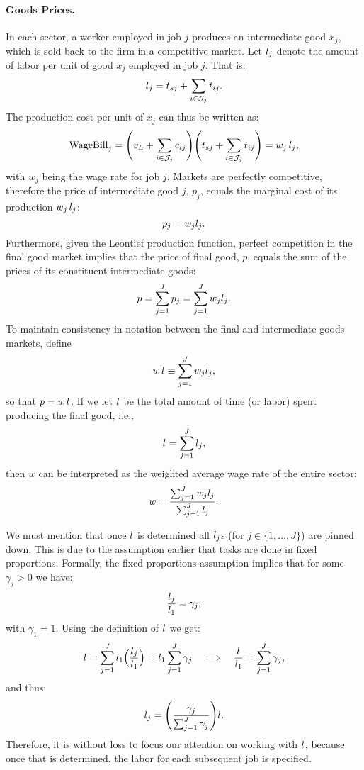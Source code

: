 \documentclass{article}
\theoremstyle{plain}
\theoremstyle{plain}
\begin{document}
\paragraph{Goods Prices.}  
In each sector, a worker employed in job $j$ produces an intermediate good $x_j$, which is sold back to the firm in a competitive market.  
Let $l_{j}$ denote the amount of labor per unit of good $x_j$ employed in job $j$.
That is:  
\[
l_{j} = t_{sj} + \sum_{i \in \mathcal{J}_j} t_{ij}.
\]  
The production cost per unit of $x_j$ can thus be written as:  
\[
\text{WageBill}_j = \Biggl(v_L + \sum_{i \in \mathcal{J}_j} c_{ij} \Biggr) \Biggl(t_{sj} + \sum_{i \in \mathcal{J}_j} t_{ij} \Biggr) = w_j \,l_{j},
\]  
with $w_j$ being the wage rate for job $j$.
Markets are perfectly competitive, therefore the price of intermediate good $j$, $p_j$, equals the marginal cost of its production $w_j\,l_{j}$:
\[
p_j = w_j l_{j}.
\]  
Furthermore, given the Leontief production function, perfect competition in the final good market implies that the price of final good, $p$, equals the sum of the prices of its constituent intermediate goods:
\[
p = \sum_{j=1}^J p_j = \sum_{j=1}^J w_j l_{j}.
\]  
To maintain consistency in notation between the final and intermediate goods markets, define  
\[
w \, l_{} \equiv \sum_{j=1}^J w_j l_{j},
\]
so that $p = w \, l_{}$.  
If we let $l_{}$ be the total amount of time (or labor) spent producing the final good, i.e.,
\[
l_{} = \sum_{j=1}^J l_{j},
\]
then $w$ can be interpreted as the weighted average wage rate of the entire sector:
\[
w = \frac{\sum_{j=1}^J w_j l_{j}}{\sum_{j=1}^J l_{j}}.
\]

We must mention that once $l_{}$ is determined all $l_{j}$s (for $j \in \{1,\ldots,J\}$) are pinned down.
This is due to the assumption earlier that tasks are done in fixed proportions.
Formally, the fixed proportions assumption implies that for some $\gamma_j > 0$ we have:  
\[
\frac{l_{j}}{l_{1}} = \gamma_j,
\]  
with $\gamma_1 = 1$.  
Using the definition of $l_{}$ we get: 
\[
l_{} = \sum_{j=1}^J l_{1} \Bigl(\frac{l_{j}}{l_{1}} \Bigr) = l_{1} \sum_{j=1}^J \gamma_j 
\quad 
\Longrightarrow
\quad 
\frac{l_{}}{l_{1}} = \sum_{j=1}^J \gamma_j,
\]  
and thus:  
\[
l_{j} = \Bigg( \frac{\gamma_j}{\sum_{j=1}^J \gamma_j} \Bigg) l_{}.
\]  
Therefore, it is without loss to focus our attention on working with $l_{}$, because once that is determined, the labor for each subsequent job is specified.
\end{document}
